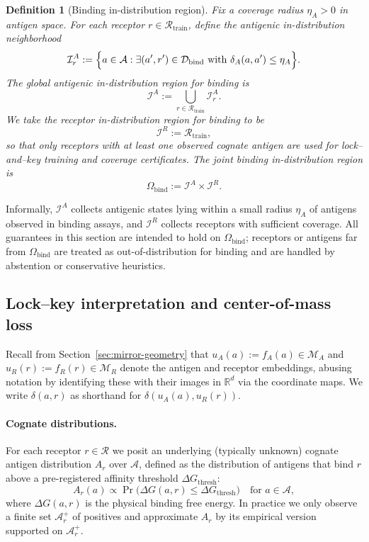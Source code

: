 \documentclass[11pt]{article}
\newcommand{\Ical}{\mathcal{I}}
\newcommand{\Dcal}{\mathcal{D}}
\newcommand{\Rcal}{\mathcal{R}}
\newcommand{\R}{\mathbb{R}}
\newcommand{\M}{\mathcal{M}}
\newcommand{\Acal}{\mathcal{A}}
\newtheorem{definition}{Definition}
\begin{document}
\begin{definition}[Binding in-distribution region]
\label{def:binding-in-distribution}
Fix a coverage radius $\eta_A>0$ in antigen space. For each receptor
$r \in \Rcal_{\mathrm{train}}$, define the antigenic in-distribution neighborhood
\[
  \Ical_r^A
    := \Bigl\{ a \in \Acal :
         \exists (a',r') \in \Dcal_{\mathrm{bind}}
         \ \text{with}\ 
         \delta_A(a,a') \le \eta_A \Bigr\}.
\]
The global antigenic in-distribution region for binding is
\[
  \Ical^A := \bigcup_{r \in \Rcal_{\mathrm{train}}} \Ical_r^A.
\]
We take the receptor in-distribution region for binding to be
\[
  \Ical^R := \Rcal_{\mathrm{train}},
\]
so that only receptors with at least one observed cognate antigen are used for
lock–and–key training and coverage certificates. The joint binding
in-distribution region is
\[
  \Omega_{\mathrm{bind}} := \Ical^A \times \Ical^R.
\]
\end{definition}

Informally, $\Ical^A$ collects antigenic states lying within a small radius
$\eta_A$ of antigens observed in binding assays, and $\Ical^R$ collects
receptors with sufficient coverage. All guarantees in this section are intended
to hold on $\Omega_{\mathrm{bind}}$; receptors or antigens far from
$\Omega_{\mathrm{bind}}$ are treated as out-of-distribution for binding and are
handled by abstention or conservative heuristics.

\subsection{Lock--key interpretation and center-of-mass loss}

Recall from Section~\ref{sec:mirror-geometry} that $u_A(a) := f_A(a)\in\M_A$
and $u_R(r) := f_R(r)\in\M_R$ denote the antigen and receptor embeddings,
abusing notation by identifying these with their images in $\R^d$ via the
coordinate maps. We write $\delta(a,r)$ as shorthand for
$\delta(u_A(a),u_R(r))$.

\paragraph{Cognate distributions.}
For each receptor $r\in\Rcal$ we posit an underlying (typically unknown)
cognate antigen distribution $A_r$ over $\Acal$, defined as the distribution of
antigens that bind $r$ above a pre-registered affinity threshold
$\Delta G_{\mathrm{thresh}}$:
\[
  A_r(a) \propto \Pr\bigl( \Delta G(a,r) \le \Delta G_{\mathrm{thresh}} \bigr)
  \quad\text{for } a \in \Acal,
\]
where $\Delta G(a,r)$ is the physical binding free energy. In practice we only
observe a finite set $\Acal_r^+$ of positives and approximate $A_r$ by its
empirical version supported on $\Acal_r^+$.
\end{document}

